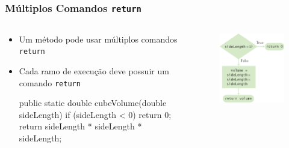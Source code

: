 \documentclass[xcolor={dvipsnames,table},aspectratio=169]{beamer}
\begin{document}
\begin{frame}[fragile]\frametitle{Múltiplos Comandos \texttt{return}}
\begin{columns}[T]
	\begin{column}{0.7\linewidth}
\begin{itemize}
	\item Um método pode usar múltiplos comandos \texttt{return}
	\item Cada ramo de execução deve possuir um comando \texttt{return}
{\scriptsize
\begin{javacode}
public static double cubeVolume(double sideLength) {
  if (sideLength < 0) { 
    return 0; 
  }
  return sideLength * sideLength * sideLength;
}
\end{javacode}
}
\end{itemize}
	\end{column}
	\begin{column}{0.3\linewidth}
\begin{figure}[h]
	\includegraphics[height=0.5\paperheight,center]{pucrs-ep-fprog-unidade_05-metodos-laminas-fluxograma_return.png}
\end{figure}
	\end{column}
\end{columns}
\end{frame}
\end{document}
